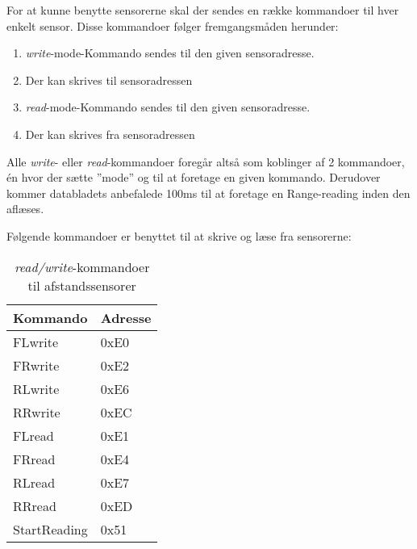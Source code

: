 For at kunne benytte sensorerne skal der sendes en række kommandoer til hver enkelt sensor. Disse kommandoer følger fremgangsmåden herunder:

\begin{enumerate}
  \item \textit{write}-mode-Kommando sendes til den given sensoradresse.
  \item Der kan skrives til sensoradressen
  \item \textit{read}-mode-Kommando sendes til den given sensoradresse.
  \item Der kan skrives fra sensoradressen
\end{enumerate}

Alle \textit{write}- eller \textit{read}-kommandoer foregår altså som koblinger af 2 kommandoer, én hvor der sætte ''mode'' og til at foretage en given kommando. Derudover kommer databladets anbefalede 100ms til at foretage en Range-reading inden den aflæses.

Følgende kommandoer er benyttet til at skrive og læse fra sensorerne: 

\begin{table}[h]\centering
	\begin{tabular}{| l | l |} \hline
		\textbf{Kommando} & \textbf{Adresse}	\\\hline
		FLwrite 		  & 0xE0				\\\hline
		FRwrite 		  & 0xE2				\\\hline
		RLwrite 		  & 0xE6				\\\hline
		RRwrite 		  & 0xEC				\\\hline
		FLread  		  & 0xE1				\\\hline
		FRread  		  & 0xE4				\\\hline
		RLread  		  & 0xE7				\\\hline
		RRread  		  & 0xED				\\\hline
		StartReading	  & 0x51				\\\hline
	\end{tabular}
	\caption{\textit{read/write}-kommandoer til afstandssensorer}
	\label{table:adr_afstandssensorer_kommadoer}
\end{table}